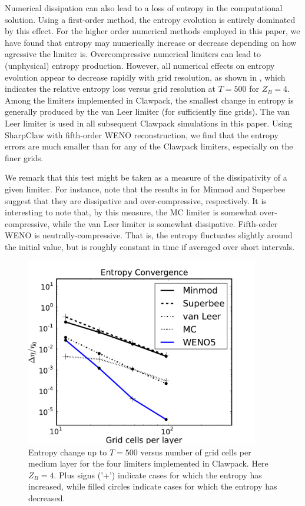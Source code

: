 Numerical dissipation can also lead to a loss of entropy in the 
computational solution.  Using a first-order method, the entropy evolution
is entirely dominated by this effect.  For the higher order numerical
methods employed in this paper, we have found that entropy may 
numerically increase or decrease
depending on how agressive the limiter is.  Overcompressive numerical 
limiters can lead to (unphysical) entropy production.  However, all
numerical effects on entropy evolution appear to decrease rapidly
with grid resolution, as shown in , which indicates
the relative entropy loss versus grid resolution at $T=500$ for $Z_B=4$.
Among the limiters implemented in Clawpack, the smallest change 
in entropy is generally produced by the van Leer limiter (for sufficiently
fine grids).
The van Leer limiter is used in all subsequent Clawpack simulations 
in this paper.  Using SharpClaw with fifth-order WENO reconstruction, 
we find that the entropy errors are much smaller than for any of the 
Clawpack limiters, especially on the finer grids.

We remark that this test might be taken as a measure of the 
 dissipativity of a given limiter.  For instance, note that
the results in  for Minmod and Superbee suggest that
they are dissipative and over-compressive, respectively.
It is interesting to note that, by this measure, the MC limiter
is somewhat over-compressive, while the van Leer limiter is somewhat
dissipative. Fifth-order WENO is neutrally-compressive.  That is, the
entropy fluctuates slightly around the initial value, but is roughly constant
in time if averaged over short intervals.

\begin{figure}
\centerline{
\includegraphics[width=4in]{figures/limiter_entropy_convergence.pdf}}
\caption{Entropy change up to $T=500$ versus number of grid cells per
medium layer for the four limiters implemented in Clawpack.  Here $Z_B=4$.
Plus signs ('+') indicate cases for which the entropy has increased, while
filled circles
indicate cases for which the entropy has decreased.\label{fig:entropy_lims}}
\end{figure}


